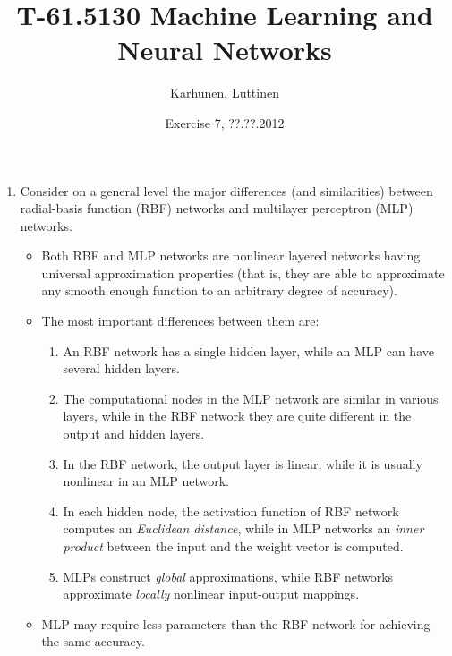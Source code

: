 
\title{T-61.5130 Machine Learning and Neural Networks}
\author{Karhunen, Luttinen}
\date{Exercise 7, ??.??.2012}

\newcommand{\vect}[1]{{\bf{#1}}}
\newcommand{\svect}[1]{\boldsymbol{#1}}
\newcommand{\matr}[1]{\boldsymbol{#1}}




\begin{enumerate}

\item Consider on a general level the major differences (and similarities)
  between radial-basis function (RBF) networks and multilayer perceptron
  (MLP) networks.

  \begin{solution}

    \begin{itemize}
    \item Both RBF and MLP networks are nonlinear layered networks having
      universal approximation properties (that is, they are able to
      approximate any smooth enough function to an arbitrary degree of accuracy).
    \item The most important differences between them are:
      \begin{enumerate}
      \item An RBF network has a single hidden layer, while an MLP can have
        several hidden layers.
      \item The computational nodes in the MLP network are similar in various layers,
        while in the RBF network they are quite different in the output
        and hidden layers.
      \item In the RBF network, the output layer is linear, while it is usually
        nonlinear in an MLP network.
      \item In each hidden node, the activation function of RBF network computes
        an {\em Euclidean distance}, while in MLP networks an {\em inner product}
        between the input and the weight vector is computed.
      \item MLPs construct {\em global} approximations, while RBF networks
        approximate {\em locally} nonlinear input-output mappings.
      \end{enumerate}
    \item MLP may require less parameters than the RBF network for achieving
      the same accuracy.
    \end{itemize}

  \end{solution}
  


\end{enumerate}
